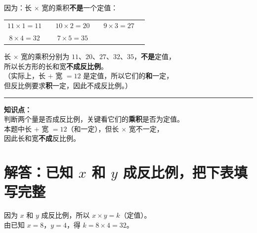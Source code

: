 \documentclass[12pt, a4paper]{ctexrep}
\begin{document}
\noindent
因为：长 $\times$ 宽的乘积\textbf{不是}一个定值：

\vspace{0.2cm}

\begin{center}
\renewcommand{\arraystretch}{1.6}
\begin{tabular}{cccccc}
$11 \times 1 = 11$ & \quad &
$10 \times 2 = 20$ & \quad &
$9 \times 3 = 27$ \\[4pt]
$8 \times 4 = 32$ & \quad &
$7 \times 5 = 35$ & & \\
\end{tabular}
\end{center}

\vspace{0.3cm}

\noindent
长 $\times$ 宽的乘积分别为 $11$、$20$、$27$、$32$、$35$，\textbf{不是}定值，\\[4pt]
所以长方形的长和宽\textbf{\textcolor{red!70!black}{不成反比例}}。\\[8pt]
（实际上，长 $+$ 宽 $= 12$ 是定值，所以它们的\textbf{和}一定，\\[2pt]
\phantom{（}但反比例要求\textbf{积}一定，因此不成反比例。）

\vspace{1cm}
\hrule
\vspace{0.4cm}

{\small\color{gray}
\textbf{知识点：}\\
判断两个量是否成反比例，关键看它们的\textbf{乘积}是否为定值。\\
本题中长 $+$ 宽 $= 12$（和一定），但长 $\times$ 宽不一定，\\
因此长和宽\textbf{不成}反比例。
}


\newpage

\section{解答：已知 $x$ 和 $y$ 成反比例，把下表填写完整}

\vspace{0.6cm}

\noindent
因为 $x$ 和 $y$ 成反比例，所以 $x \times y = k$（定值）。\\[4pt]
由已知 $x = 8$，$y = 4$，得 $k = 8 \times 4 = 32$。

\vspace{0.6cm}
\end{document}
